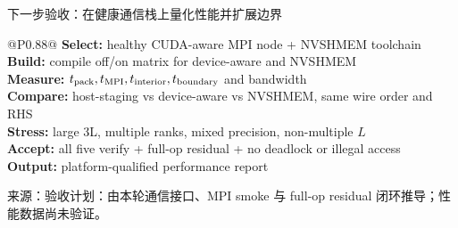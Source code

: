 \documentclass[UTF8,aspectratio=169,11pt]{ctexbeamer}
\newcommand{\source}[1]{%
  \vspace{0.06em}\par{\raggedright\scriptsize\color{muted}来源：#1\par}}
\begin{document}
\begin{frame}[t]{下一步验收：在健康通信栈上量化性能并扩展边界}
  \begin{table}[htbp]
    \centering
    \caption*{Pseudocode — next reproducible acceptance loop}
    \footnotesize
    \renewcommand{\arraystretch}{0.82}
    \begin{tabular}{@{}P{0.88\textwidth}@{}}
      \textbf{Select:} healthy CUDA-aware MPI node + NVSHMEM toolchain \\
      \textbf{Build:} compile off/on matrix for device-aware and NVSHMEM \\
      \textbf{Measure:} $t_{\rm pack},t_{\rm MPI},t_{\rm interior},t_{\rm boundary}$ and bandwidth \\
      \textbf{Compare:} host-staging vs device-aware vs NVSHMEM, same wire order and RHS \\
      \textbf{Stress:} large 3L, multiple ranks, mixed precision, non-multiple $L$ \\
      \textbf{Accept:} all five verify + full-op residual + no deadlock or illegal access \\
      \textbf{Output:} platform-qualified performance report
    \end{tabular}
  \end{table}
  \vspace{0.2em}
  \begin{center}
  \end{center}
  \source{验收计划：由本轮通信接口、MPI smoke 与 full-op residual 闭环推导；性能数据尚未验证。}
\end{frame}

\appendix
\end{document}
